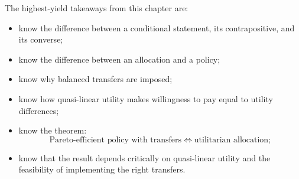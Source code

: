 \begin{examtip}
The highest-yield takeaways from this chapter are:
\begin{itemize}
    \item know the difference between a conditional statement, its contrapositive, and its converse;
    \item know the difference between an allocation and a policy;
    \item know why balanced transfers are imposed;
    \item know how quasi-linear utility makes willingness to pay equal to utility differences;
    \item know the theorem:
    \[
    \text{Pareto-efficient policy with transfers}
    \iff
    \text{utilitarian allocation};
    \]
    \item know that the result depends critically on quasi-linear utility and the feasibility of implementing the right transfers.
\end{itemize}
\end{examtip}